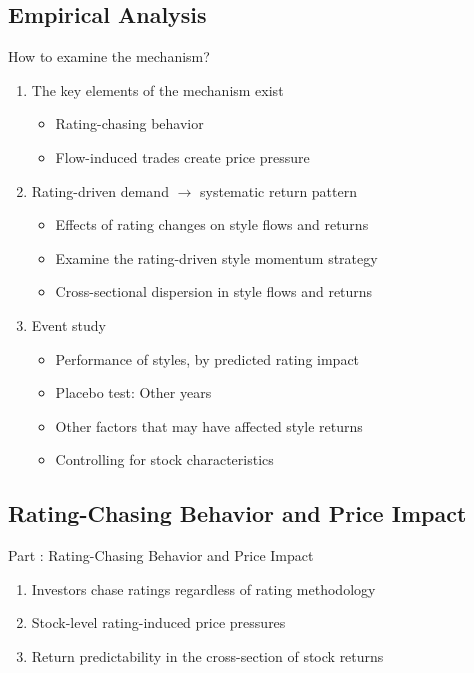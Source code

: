 \documentclass[UTF8, 16pt]{beamer}
\begin{document}
\begin{CJK*}{UTF8}{gbsn}
\section{Empirical Analysis}

\begin{frame}{How to examine the mechanism?}
	\begin{enumerate}
		\item The key elements of the mechanism exist
		\begin{itemize}
			\item Rating-chasing behavior
			\item Flow-induced trades create price pressure
		\end{itemize}
		\item Rating-driven demand $\rightarrow$ systematic return pattern
		\begin{itemize}
			\item Effects of rating changes on style flows and returns
			\item Examine the rating-driven style momentum strategy
			\item Cross-sectional dispersion in style flows and returns
		\end{itemize}
		\item Event study
		\begin{itemize}
			\item Performance of styles, by predicted rating impact
			\item Placebo test: Other years
			\item Other factors that may have affected style returns
			\item Controlling for stock characteristics
		\end{itemize} 
	\end{enumerate}
\end{frame}

\subsection{Rating-Chasing Behavior and Price Impact}

\begin{frame}{Part \uppercase\expandafter{}: Rating-Chasing Behavior and Price Impact}
	 \begin{enumerate}
	 	\item Investors chase ratings regardless of rating methodology
	 	\item Stock-level rating-induced price pressures
	 	\item Return predictability in the cross-section of stock returns
	 \end{enumerate}
\end{frame}


\end{CJK*}
\end{document}
